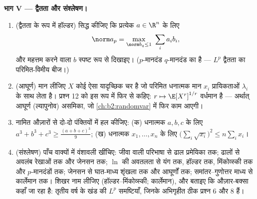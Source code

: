 \begin{problem}[{सप्ताहांत समस्या --- यंग, हॉल्डर, मिंकोव्स्की
और घात-माध्य शृंखला}]
\medskip
\noindent\textbf{भाग V --- द्वैतता और संश्लेषण।}
\begin{enumerate}[resume]
  \item (द्वैतता के रूप में हॉल्डर) सिद्ध कीजिए कि प्रत्येक $a \in
        \R^n$ के लिए
        \[
        \norm a_p = \max_{\norm b_q \leq 1}\ \sum_i a_ib_i ,
        \]
        और महत्तम करने वाला $b$ स्पष्ट रूप से दिखाइए। ($p$-मानदंड
        $q$-मानदंड का  है --- $L^p$ द्वैतता का परिमित-विमीय बीज।)
  \item (आघूर्ण) मान लीजिए $X$ कोई ऐसा यादृच्छिक चर है जो परिमित
        धनात्मक मान $x_i$ प्रायिकताओं $\lambda_i$ के साथ लेता है। प्रश्न 12 को इस
        रूप में फिर से कहिए: $r \mapsto
        \E[X^r]^{1/r}$ वर्धमान है --- अर्थात् आघूर्ण
        (ल्यापुनोव) असमिका, जो \cref{ch:b2:randomvar} में फिर काम आएगी।
  \item नामित औज़ारों से दो-दो पंक्तियों में हल कीजिए: (क) धनात्मक $a, b, c$
        के लिए $a^3 + b^3 + c^3 \geq
        \frac{(a+b+c)^3}{9}$; (ख) धनात्मक $x_1, \dots,
        x_n$ के लिए $\bigl(\sum_i\sqrt{x_i}\bigr)^2 \leq
        n\sum_i x_i$।
  \item (संश्लेषण) पाँच वाक्यों में वंशावली खींचिए: जीवा वाली परिभाषा से
        ढाल प्रमेयिका तक; ढालों से अवलंब रेखाओं तक और जेनसन तक; $\ln$ की
        अवतलता से यंग तक, हॉल्डर तक, मिंकोव्स्की तक और $p$-मानदंडों
        तक; जेनसन से घात-माध्य शृंखला तक और आघूर्णों तक; समांतर--गुणोत्तर
        माध्य से कार्लेमान तक। शिखर नाम लीजिए (हॉल्डर--मिंकोव्स्की;
        कार्लेमान), और बताइए कि औज़ार-बक्सा कहाँ जा रहा है: तृतीय वर्ष के
        खंड की $L^p$ समष्टियाँ, जिनके अभिगृहीत ठीक प्रश्न 6 और 8 हैं।
\end{enumerate}
\end{problem}
